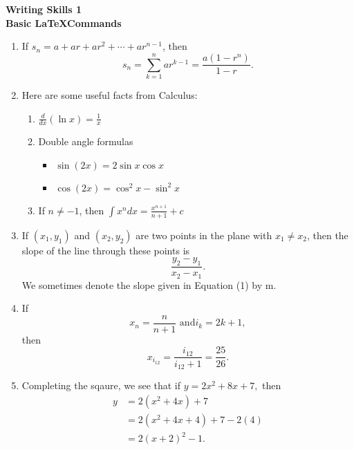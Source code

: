 \documentclass[12pt]{article}
\begin{document}
\begin{center}
\textbf{Writing Skills 1\\
Basic \LaTeX Commands}
\end{center}

\begin{enumerate}
    \item If $s_n = a + ar + ar^2 + \cdots + ar^{n-1}$, then 
        \[s_n = \sum_{k=1}^{n} ar^{k-1} = \frac{a(1-r^n)}{1-r}.\]
    \item Here are some useful facts from Calculus:
        \begin{enumerate}
            \item $\displaystyle \frac{d}{dx}(\ln x) = \frac{1}{x}$
            \item Double angle formulas
                \begin{itemize}
                    \item $\sin(2x) = 2\sin x \cos x$
                    \item $\cos(2x) = \cos^2x - \sin^2x$
                \end{itemize}
            \item If $n \neq -1$, then  $\displaystyle \int x^n dx = \frac{x^{n+1}}{n+1} +c$
        \end{enumerate}
    \item If $(x_1,y_1)$ and $(x_2,y_2)$ are two points in the plane with $x_1 \neq x_2$, then the slope of the line through these points is
    \begin{equation}
        \frac{y_2 - y_1}{x_2 - x_1}
        .
    \end{equation}
    We sometimes denote the slope given in Equation (1) by m.
    \item If \[ x_n = \frac{n}{n+1}  \text{ and}  i_k = 2k+1 ,\] then
                \[x_{i_{12}} = \frac{i_{12}}{i_{12}+1}= \frac{25}{26}.\]
    \item Completing the sqaure, we see that if $y = 2x^2 + 8x +7,$ then 
        \begin{align*}
            y &= 2(x^2 +4x)+7 \\
            &= 2(x^2+4x+4)+7-2(4)\\
            &=2(x+2)^2 -1. 
        \end{align*}
        
        
    
\end{enumerate}
\end{document}
